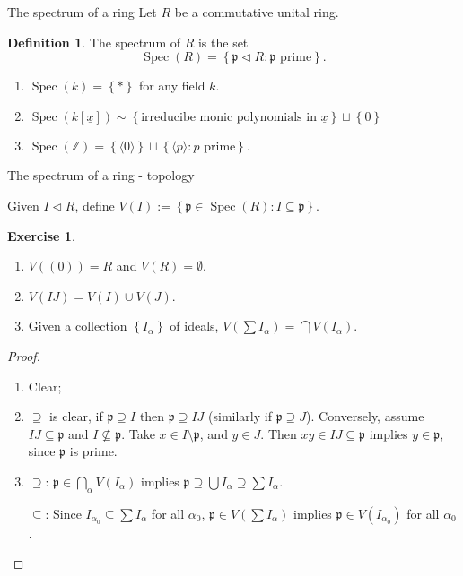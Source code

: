 \documentclass[12pt, draft,reqno,a4paper, twoside]{beamer}
\theoremstyle{plain}
\theoremstyle{definition}
\newtheorem{defi}{Definition}
\newtheorem{exer}{Exercise}
\DeclareMathOperator{\spec}{Spec}
\newcommand{\dbZ}{\mathbb Z}
\newcommand{\bmx}{\underline{x}}
\newcommand{\fp}{\mathfrak{p}}
\newcommand{\gen}[1]{\langle{#1}\rangle}
\newcommand{\set}[1]{\left\{{#1}\right\}}
\newcommand{\normal}{\triangleleft}
\begin{document}
\begin{frame}{The spectrum of a ring}
Let $R$ be a commutative unital ring. 
\begin{defi}
	The spectrum of $R$ is the set 
	\[\spec(R)=\set{\fp\normal R:\fp\text{ prime}}.\]
\end{defi}
\begin{examples}
	\begin{enumerate}
		\item<2-> $\spec(k)=\set{\ast}$ for any field $k$.
		\item<3-> $\spec(k[\bmx])\sim\set{\text{irreducibe monic polynomials in }\bmx}\sqcup\set{0}$
		\item<4-> $\spec(\dbZ)=\set{\gen{0}}\sqcup\set{\gen{p}:{p\text{ prime}}}$.
	\end{enumerate}
\end{examples}
\end{frame}

\begin{frame}{The spectrum of a ring - topology}

Given $I\normal R$, define $V(I):=\set{\fp\in\spec(R):I\subseteq \fp}$.\begin{exer} 
\begin{enumerate}
	\item<2-> $V((0))=R$ and $V(R)=\emptyset$.
	\item<3-> $V(IJ)=V(I)\cup V(J)$. 
	\item<4-> Given a collection $\set{I_\alpha}$ of ideals, $V(\sum I_\alpha)=\bigcap V(I_\alpha)$.
\end{enumerate}
\end{exer}
\begin{proof}
	\begin{enumerate}
		\item<6-> Clear;
		\item<7-> $\supseteq$ is clear, if $\fp\supseteq I$ then $\fp\supseteq IJ$ (similarly if $\fp\supseteq J$). \onslide<8-> Conversely, assume $IJ\subseteq\fp$ and $I\not\subseteq \fp$. Take $x\in I\setminus\fp$, and $y\in J$. Then $xy\in IJ\subseteq\fp$ implies $y\in\fp$, since $\fp$ is prime.
		\item<9-> $\supseteq$: $\fp\in\bigcap_\alpha V(I_\alpha)$ implies $\fp\supseteq \bigcup I_\alpha\supseteq \sum I_\alpha$. 
		
		 $\subseteq$: Since $I_{\alpha_0}\subseteq\sum I_\alpha$ for all $\alpha_0$, $\fp\in V(\sum I_\alpha)$ implies $\fp\in V(I_{\alpha_0})$ for all $\alpha_0$. 
		
	\end{enumerate}
\end{proof}
\end{frame}
\end{document}
